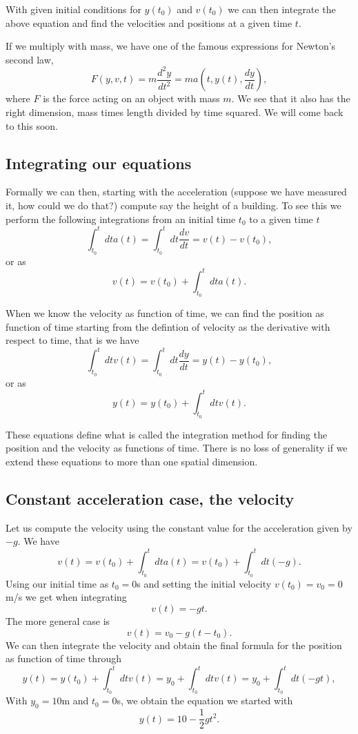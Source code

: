 \documentclass[%
oneside,                 %
final,                   %
10pt]{article}
\begin{document}
With given initial conditions for $y(t_0)$ and $v(t_0)$ we can then
integrate the above equation and find the velocities and positions at
a given time $t$.

If we multiply with mass, we have one of the famous expressions for Newton's second law,
\[
F(y,v,t)=m\frac{d^2y}{dt^2}=ma(t,y(t),\frac{dy}{dt}),
\]
where $F$ is the force acting on an object with mass $m$. We see that it also has the right dimension, mass times length divided by time squared.
We will come back to this soon.

\subsection{Integrating our equations}

Formally we can then, starting with the acceleration (suppose we have measured it, how could we do that?)
compute say the height of a building.  To see this we perform the following integrations from an initial time $t_0$  to a given time $t$
\[
\int_{t_0}^t dt a(t) = \int_{t_0}^t dt \frac{dv}{dt} = v(t)-v(t_0),
\]
or as 
\[
v(t)=v(t_0)+\int_{t_0}^t dt a(t).
\]

When we know the velocity as function of time, we can find the position as function of time starting from the defintion of velocity as the derivative with respect to time, that is we have
\[
\int_{t_0}^t dt v(t) = \int_{t_0}^t dt \frac{dy}{dt} = y(t)-y(t_0),
\]
or as 
\[
y(t)=y(t_0)+\int_{t_0}^t dt v(t).
\]

These equations define what is called the integration method for
finding the position and the velocity as functions of time. There is
no loss of generality if we extend these equations to more than one
spatial dimension.

\subsection{Constant acceleration case, the velocity}

Let us compute the velocity using the constant value for the acceleration given by $-g$. We have
\[
v(t)=v(t_0)+\int_{t_0}^t dt a(t)=v(t_0)+\int_{t_0}^t dt (-g).
\]
Using our initial time as $t_0=0$s and setting the initial velocity $v(t_0)=v_0=0$m/s we get when integrating
\[
v(t)=-gt.
\]
The more general case is
\[
v(t)=v_0-g(t-t_0).
\]
We can then integrate the velocity and obtain the final formula for the position as function of time through
\[
y(t)=y(t_0)+\int_{t_0}^t dt v(t)=y_0+\int_{t_0}^t dt v(t)=y_0+\int_{t_0}^t dt (-gt),
\]
With $y_0=10$m and $t_0=0$s, we obtain the equation we started with
\[
y(t)=10-\frac{1}{2}gt^2.
\]
\end{document}
